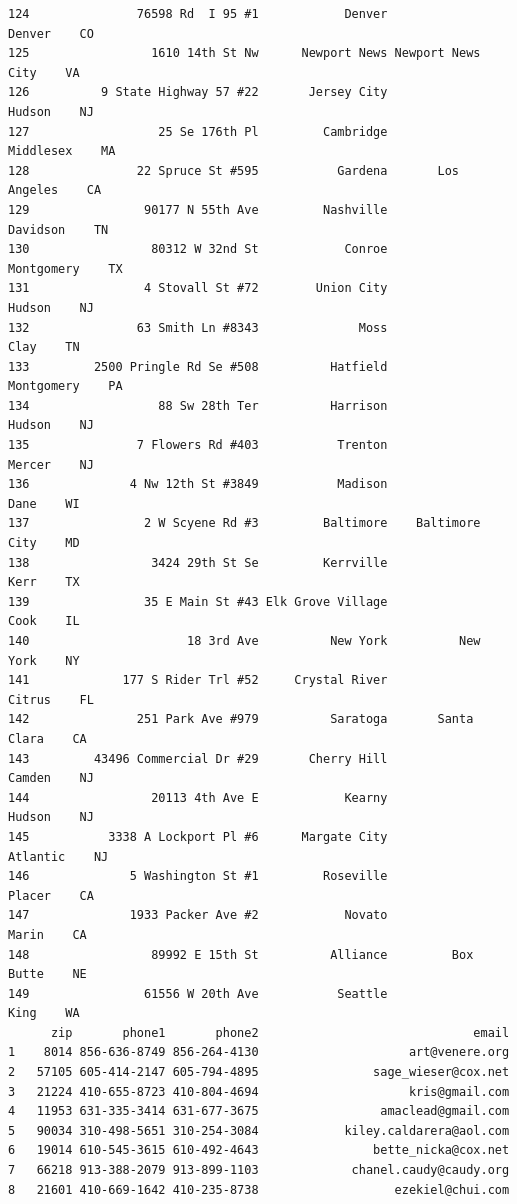 \documentclass[
  12pt,
]{article}
\begin{document}
\begin{verbatim}
124               76598 Rd  I 95 #1            Denver            Denver    CO
125                 1610 14th St Nw      Newport News Newport News City    VA
126          9 State Highway 57 #22       Jersey City            Hudson    NJ
127                  25 Se 176th Pl         Cambridge         Middlesex    MA
128               22 Spruce St #595           Gardena       Los Angeles    CA
129                90177 N 55th Ave         Nashville          Davidson    TN
130                 80312 W 32nd St            Conroe        Montgomery    TX
131                4 Stovall St #72        Union City            Hudson    NJ
132               63 Smith Ln #8343              Moss              Clay    TN
133         2500 Pringle Rd Se #508          Hatfield        Montgomery    PA
134                  88 Sw 28th Ter          Harrison            Hudson    NJ
135               7 Flowers Rd #403           Trenton            Mercer    NJ
136              4 Nw 12th St #3849           Madison              Dane    WI
137                2 W Scyene Rd #3         Baltimore    Baltimore City    MD
138                 3424 29th St Se         Kerrville              Kerr    TX
139                35 E Main St #43 Elk Grove Village              Cook    IL
140                      18 3rd Ave          New York          New York    NY
141             177 S Rider Trl #52     Crystal River            Citrus    FL
142               251 Park Ave #979          Saratoga       Santa Clara    CA
143         43496 Commercial Dr #29       Cherry Hill            Camden    NJ
144                 20113 4th Ave E            Kearny            Hudson    NJ
145           3338 A Lockport Pl #6      Margate City          Atlantic    NJ
146              5 Washington St #1         Roseville            Placer    CA
147              1933 Packer Ave #2            Novato             Marin    CA
148                 89992 E 15th St          Alliance         Box Butte    NE
149                61556 W 20th Ave           Seattle              King    WA
      zip       phone1       phone2                              email
1    8014 856-636-8749 856-264-4130                     art@venere.org
2   57105 605-414-2147 605-794-4895                sage_wieser@cox.net
3   21224 410-655-8723 410-804-4694                     kris@gmail.com
4   11953 631-335-3414 631-677-3675                 amaclead@gmail.com
5   90034 310-498-5651 310-254-3084            kiley.caldarera@aol.com
6   19014 610-545-3615 610-492-4643                bette_nicka@cox.net
7   66218 913-388-2079 913-899-1103             chanel.caudy@caudy.org
8   21601 410-669-1642 410-235-8738                   ezekiel@chui.com

\end{verbatim}
\end{document}
